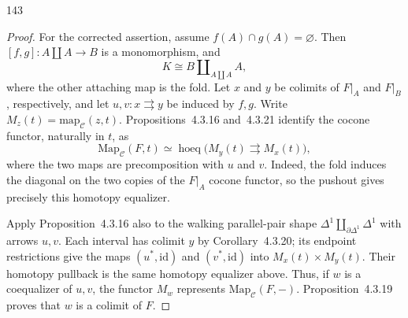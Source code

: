 \begin{exercise}{143}
\begin{proof}
For the corrected assertion, assume $f(A)\cap g(A)=\varnothing$.
Then $[f,g]\colon A\amalg A\to B$ is a monomorphism, and
\[
 K\cong B\amalg_{A\amalg A}A,
\]
where the other attaching map is the fold.
Let $x$ and $y$ be colimits of $F|_A$ and $F|_B$, respectively, and
let $u,v\colon x\rightrightarrows y$ be induced by $f,g$.
Write $M_z(t)=\mathrm{map}_{\mathcal C}(z,t)$.
Propositions~4.3.16 and~4.3.21 identify the cocone functor, naturally in $t$, as
\[
 \mathrm{Map}_{\mathcal C}(F,t)\simeq
 \operatorname{hoeq}\bigl(M_y(t)\rightrightarrows M_x(t)\bigr),
\]
where the two maps are precomposition with $u$ and $v$.
Indeed, the fold induces the diagonal on the two copies of the
$F|_A$ cocone functor, so the pushout gives precisely this homotopy equalizer.

Apply Proposition~4.3.16 also to the walking parallel-pair shape
$\Delta^1\amalg_{\partial\Delta^1}\Delta^1$ with arrows $u,v$.
Each interval has colimit $y$ by Corollary~4.3.20; its endpoint
restrictions give the maps $(u^*,\mathrm{id})$ and
$(v^*,\mathrm{id})$ into $M_x(t)\times M_y(t)$.
Their homotopy pullback is the same homotopy equalizer above.
Thus, if $w$ is a coequalizer of $u,v$, the functor $M_w$ represents
$\mathrm{Map}_{\mathcal C}(F,-)$.
Proposition~4.3.19 proves that $w$ is a colimit of $F$.
\end{proof}
\end{exercise}

